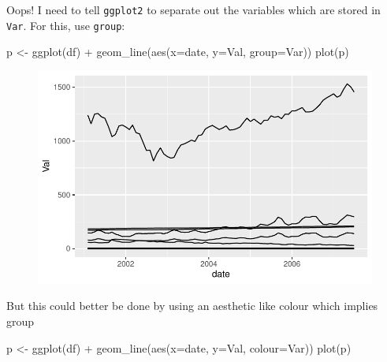 \documentclass[
  letterpaper,
]{book}
\newenvironment{Shaded}{\begin{snugshade}}{\end{snugshade}}
\newcommand{\AttributeTok}[1]{\textcolor[rgb]{0.40,0.45,0.13}{#1}}
\newcommand{\FunctionTok}[1]{\textcolor[rgb]{0.28,0.35,0.67}{#1}}
\newcommand{\NormalTok}[1]{\textcolor[rgb]{0.00,0.23,0.31}{#1}}
\newcommand{\OtherTok}[1]{\textcolor[rgb]{0.00,0.23,0.31}{#1}}
\newcommand{\SpecialCharTok}[1]{\textcolor[rgb]{0.37,0.37,0.37}{#1}}
\begin{document}
Oops! I need to tell \texttt{ggplot2} to separate out the variables
which are stored in \texttt{Var}. For this, use \texttt{group}:

\begin{Shaded}
\begin{Highlighting}[]
\NormalTok{p  }\OtherTok{\textless{}{-}} \FunctionTok{ggplot}\NormalTok{(df) }\SpecialCharTok{+}
  \FunctionTok{geom\_line}\NormalTok{(}\FunctionTok{aes}\NormalTok{(}\AttributeTok{x=}\NormalTok{date, }\AttributeTok{y=}\NormalTok{Val, }\AttributeTok{group=}\NormalTok{Var))}
\FunctionTok{plot}\NormalTok{(p)}
\end{Highlighting}
\end{Shaded}

\begin{figure}[H]

{\centering \includegraphics{Appendix1_files/figure-pdf/unnamed-chunk-8-1.pdf}

}

\end{figure}

But this could better be done by using an aesthetic like colour which
implies group

\begin{Shaded}
\begin{Highlighting}[]
\NormalTok{p  }\OtherTok{\textless{}{-}} \FunctionTok{ggplot}\NormalTok{(df) }\SpecialCharTok{+}
  \FunctionTok{geom\_line}\NormalTok{(}\FunctionTok{aes}\NormalTok{(}\AttributeTok{x=}\NormalTok{date, }\AttributeTok{y=}\NormalTok{Val, }\AttributeTok{colour=}\NormalTok{Var))}
\FunctionTok{plot}\NormalTok{(p)}
\end{Highlighting}
\end{Shaded}
\end{document}

